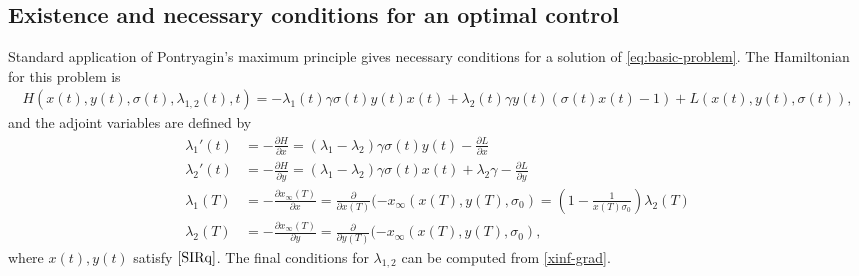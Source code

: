 \documentclass[english,12pt,letter]{article}
\newcommand{\Rnot}{\sigma_0}
\newcommand{\Sinf}{x_\infty}
\begin{document}
\subsection{Existence and necessary conditions for an optimal control\label{sec:pmp}}
Standard application of Pontryagin's maximum principle gives necessary conditions
for a solution of \eqref{eq:basic-problem}.  The Hamiltonian for this problem is
\begin{align} \label{eq:ham}
    H(x(t),y(t), \sigma(t), \lambda_{1,2}(t), t) = -\lambda_1(t) \gamma \sigma(t) y(t) x(t) + \lambda_2(t)\gamma y(t)(\sigma(t) x(t) - 1) + L(x(t),y(t),\sigma(t)),
\end{align}
and the adjoint variables are defined by
\begin{subequations}\label{lambda-odes}
\begin{align} 
    \lambda_1'(t) & = -\frac{\partial H}{\partial x} = (\lambda_1-\lambda_2)\gamma\sigma(t) y(t) - \frac{\partial L}{\partial x} \\
    \lambda_2'(t) & = -\frac{\partial H}{\partial y} = (\lambda_1-\lambda_2)\gamma\sigma(t) x(t) + \lambda_2 \gamma - \frac{\partial L}{\partial y} \\
    \lambda_1(T) & = -\frac{\partial \Sinf(T)}{\partial x} =\frac{\partial }{\partial x(T)} (-x_\infty(x(T),y(T),\Rnot) = \left(1-\frac{1}{x(T)\Rnot}\right)\lambda_2(T) \label{bc1} \\
    \lambda_2(T) & = -\frac{\partial \Sinf(T)}{\partial y} = \frac{\partial }{\partial y(T)} (-x_\infty(x(T),y(T),\Rnot), \label{bc2}
\end{align}
\end{subequations}
where $x(t), y(t)$ satisfy $\eqref{SIRq}$.
The final conditions for $\lambda_{1,2}$ can be computed from \eqref{xinf-grad}.
\end{document}
